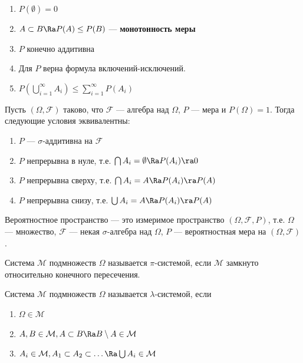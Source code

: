 \begin{note}
    \begin{enumerate}
        \item \(P(\emptyset) = 0\)
        \item \(A \subset B \Ra P(A) \le P(B)\) --- \textbf{монотонность меры}
        \item \(P\) конечно аддитивна
        \item Для \(P\) верна формула включений-исключений.
        \item \(P\left( \bigcup_{i = 1}^\infty A_i \right) \le \sum_{i = 1}^\infty P(A_i)\)
    \end{enumerate}
\end{note}

\begin{theorem}
    Пусть \((\Omega, \mathcal{F})\) таково, что \(\mathcal{F}\) --- алгебра над \(\Omega\), \(P\) --- мера и \(P(\Omega) = 1\). Тогда следующие условия эквивалентны:
    \begin{enumerate}
        \item \(P\) --- \(\sigma\)-аддитивна на \(\mathcal{F}\)
        \item \(P\) непрерывна в нуле, т.е. \(\bigcap A_i = \emptyset \Ra P(A_i) \ra 0\)
        \item \(P\) непрерывна сверху, т.е. \(\bigcap A_i = A \Ra P(A_i) \ra P(A)\)
        \item \(P\) непрерывна снизу, т.е. \(\bigcup A_i = A \Ra P(A_i) \ra P(A)\)
    \end{enumerate}
\end{theorem}

\begin{definition}
    Вероятностное пространство --- это измеримое пространство \((\Omega, \mathcal{F}, P)\), т.е. \(\Omega\) --- множество, \(\mathcal{F}\) --- некая \(\sigma\)-алгебра над \(\Omega\), \(P\) --- вероятностная мера на \((\Omega, \mathcal{F})\).
\end{definition}

\begin{definition}
    Система \(\mathcal{M}\) подмножеств \(\Omega\) называется \(\pi\)-системой, если \(\mathcal{M}\) замкнуто относительно конечного пересечения.
\end{definition}

\begin{definition}
    Система \(\mathcal{M}\) подмножеств \(\Omega\) называется \(\lambda\)-системой, если
    \begin{enumerate}
        \item \(\Omega \in \mathcal{M}\)
        \item \(A, B \in \mathcal{M}, A \subset B \Ra B \setminus A \in \mathcal{M}\)
        \item \(A_i \in \mathcal{M}, A_1 \subset A_2 \subset \dots \Ra \bigcup A_i \in \mathcal{M}\)
    \end{enumerate}
\end{definition}

